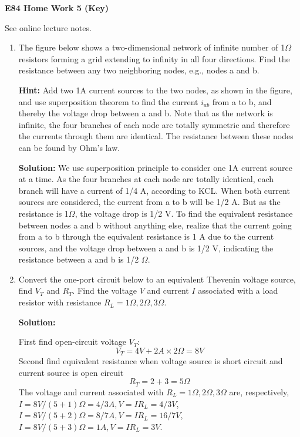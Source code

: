 \usepackage{html}

\begin{center}
{\Large \bf E84 Home Work 5 (Key)}
\end{center}
See online lecture notes.




\begin{enumerate}

\item The figure below shows a two-dimensional network of infinite number 
of 1$\Omega$ resistors forming a grid extending to infinity in all four 
directions. Find the resistance between any two neighboring nodes, e.g., 
nodes a and b.


{\bf Hint:} Add two 1A current sources to the two nodes, as shown in the 
figure, and use superposition theorem to find the current $i_{ab}$ from 
a to b, and thereby the voltage drop between a and b. Note that as the
network is infinite, the four branches of each node are totally symmetric
and therefore the currents through them are identical. The resistance 
between these nodes can be found by Ohm's law.

{\bf Solution:}
We use superposition principle to consider one 1A current source at a time.
As the four branches at each node are totally identical, each branch will
have a current of 1/4 A, according to KCL. When both current sources are
considered, the current from a to b will be 1/2 A. But as the resistance
is 1$\Omega$, the voltage drop is 1/2 V. To find the equivalent resistance
between nodes a and b without anything else, realize that the current going
from a to b through the equivalent resistance is 1 A due to the current 
sources, and the voltage drop between a and b is 1/2 V, indicating the 
resistance between a and b is 1/2 $\Omega$.

\item Convert the one-port circuit below to an equivalent Thevenin voltage
source, find $V_T$ and $R_T$. Find the voltage $V$ and current $I$ associated
with a load resistor with resistance $R_L=1\Omega, 2\Omega, 3\Omega$.


{\bf Solution:}

First find open-circuit voltage $V_T$:
\[ V_T=4V+2A \times 2\Omega = 8V \]
Second find equivalent resistance when voltage source is short circuit
and current source is open circuit
\[ R_T=2+3=5\Omega \]
The voltage and current associated with $R_L=1\Omega, 2\Omega, 3\Omega$ are, 
respectively, 
$I=8V/(5+1)\Omega=4/3A, V=IR_L=4/3V$, 
$I=8V/(5+2)\Omega=8/7A, V=IR_L=16/7V$, 
$I=8V/(5+3)\Omega=1A, V=IR_L=3V$.


\end{enumerate}
